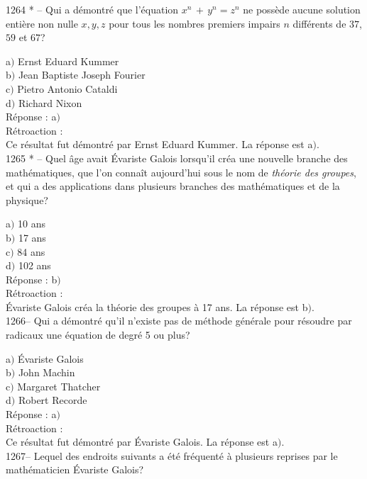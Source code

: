 ﻿\documentclass[letterpaper, 12pt]{article}
\begin{document}
1264 * -- Qui a d\'emontr\'e que l'\'equation $x^n\,+\,y^n=z^n$ ne
poss\`ede aucune solution enti\`ere non nulle $x,y,z$ pour tous les
nombres premiers impairs $n$ diff\'erents de $37$, $59$ et $67$?

a$)$ Ernst Eduard Kummer \\
b$)$ Jean Baptiste Joseph Fourier \\
c$)$ Pietro Antonio Cataldi \\
d$)$ Richard Nixon\\

R\'eponse : a$)$\\

R\'etroaction : \\
Ce r\'esultat fut d\'emontr\'e par Ernst Eduard Kummer.
La r\'eponse est a$)$.\\

1265 * -- Quel \^age avait \'Evariste Galois lorsqu'il cr\'ea une
nouvelle branche des math\'ematiques, que l'on conna\^it aujourd'hui
sous le nom de {\sl th\'eorie des groupes}, et qui a des
applications dans plusieurs branches des math\'ematiques et de la
physique?

a$)$ 10 ans \\
b$)$ 17 ans \\
c$)$ 84 ans \\
d$)$ 102 ans\\

R\'eponse : b$)$\\

R\'etroaction : \\
\'Evariste Galois cr\'ea la th\'eorie des groupes \`a 17 ans.
La r\'eponse est b$)$.\\

1266-- Qui a d\'emontr\'e qu'il n'existe pas de m\'ethode
g\'en\'erale pour r\'esoudre par radicaux une \'equation de degr\'e
5 ou plus?

a$)$ \'Evariste Galois \\
b$)$ John Machin \\
c$)$ Margaret Thatcher \\
d$)$ Robert Recorde\\

R\'eponse : a$)$\\

R\'etroaction : \\
Ce r\'esultat fut d\'emontr\'e par \'Evariste Galois.
La r\'eponse est a$)$.\\

1267-- Lequel des endroits suivants a \'et\'e fr\'equent\'e \`a
plusieurs reprises par le math\'ematicien \'Evariste Galois?
\end{document}
